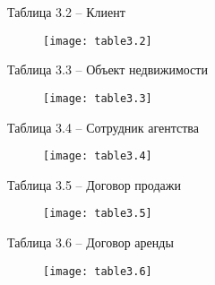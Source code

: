 Таблица 3.2 – Клиент
\begin{figure}[H]
	\texttt{[image: table3.2]}
	\label{tabl3.2:image}
\end{figure}

Таблица 3.3 – Объект недвижимости
\begin{figure}[H]
	\texttt{[image: table3.3]}
	\label{tabl3.3:image}
\end{figure}

Таблица 3.4 – Сотрудник агентства
\begin{figure}[H]
	\texttt{[image: table3.4]}
	\label{tabl3.4:image}
\end{figure}

Таблица 3.5 – Договор продажи
\begin{figure}[H]
	\texttt{[image: table3.5]}
	\label{tabl3.5:image}
\end{figure}
Таблица 3.6 – Договор аренды
\begin{figure}[H]
	\texttt{[image: table3.6]}
	\label{tabl3.6:image}
\end{figure}